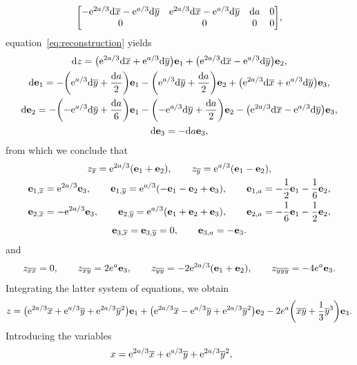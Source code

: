 \documentclass[10pt,a4paper]{amsart}
\numberwithin{equation}{section}
\newcommand{\ox}{\overline{x}}
\newcommand{\oy}{\overline{y}}
\newcommand{\ve}{\mathbf{e}}
\begin{document}
\begin{Example}
\begin{gather}
\begin{bmatrix}
%
-{\rm e}^{2a/3}{\rm d}\ox - {\rm e}^{a/3}{\rm d}\oy & {\rm e}^{2a/3}{\rm d}\ox - {\rm e}^{a/3}{\rm d}\oy & {\rm d}a & 0 \\
%
0 & 0 & 0 &0
\end{bmatrix}\!,
\label{bmu}
\end{gather}
%
equation~\eqref{eq:reconstruction} yields
%
\begin{gather*}
{\rm d}z = \big({\rm e}^{2a/3}{\rm d}\ox + {\rm e}^{a/3}{\rm d}\oy\big)\ve_1
+ \big({\rm e}^{2a/3}{\rm d}\ox - {\rm e}^{a/3}{\rm d}\oy\big)\ve_2,
\\
{\rm d}\ve_1 = -\bigg({\rm e}^{a/3} {\rm d}\oy + \frac{{\rm d}a}{2}\bigg)\ve_1 - \bigg({\rm e}^{a/3}{\rm d}\oy
+ \frac{{\rm d}a}{2}\bigg)\ve_2 + \big({\rm e}^{2a/3}{\rm d}\ox + {\rm e}^{a/3}{\rm d}\oy\big)\ve_3,
\\
{\rm d}\ve_2 = -\bigg({-}{\rm e}^{a/3} {\rm d}\oy + \frac{{\rm d}a}{6}\bigg)\ve_1 - \bigg({-}{\rm e}^{a/3} {\rm d}\oy + \frac{{\rm d}a}{2}\bigg)\ve_2 - \big({\rm e}^{2a/3}{\rm d}\ox - {\rm e}^{a/3}{\rm d}\oy\big)\ve_3, \\
%
{\rm d}\ve_3 = -{\rm d}a \ve_3,
\end{gather*}
%
from which we conclude that
%
\begin{gather*}
z_{\ox} = {\rm e}^{2a/3}(\ve_1 + \ve_2), \qquad
z_{\oy} = {\rm e}^{a/3}(\ve_1 - \ve_2),
\\
\ve_{1,\ox} = {\rm e}^{2a/3}\ve_3,\qquad
\ve_{1,\oy} = {\rm e}^{a/3}(-\ve_1-\ve_2+\ve_3),\qquad
\ve_{1,a} = -\frac{1}{2}\ve_1 - \frac{1}{6}\ve_2,
\\
\ve_{2,\ox} = -{\rm e}^{2a/3}\ve_3,\qquad
\ve_{2,\oy} = {\rm e}^{a/3}(\ve_1+\ve_2+\ve_3),\qquad
\ve_{2,a} = -\frac{1}{6}\ve_1 - \frac{1}{2}\ve_2,
\\
\ve_{3,\ox} =\ve_{3,\oy}=0,\qquad \ve_{3,a}=-\ve_3.
\end{gather*}
%
and
\begin{gather*}
z_{
\ox\ox} = 0,\qquad z_{\ox\oy} = 2e^a\ve_3,\qquad z_{\oy\oy} = -2{\rm e}^{2a/3}(\ve_1+\ve_2),\qquad z_{\oy\oy\oy}= -4e^a\ve_3.
\end{gather*}
Integrating the latter system of equations, we obtain
\begin{gather*}
z = \big({\rm e}^{2a/3}\ox + {\rm e}^{a/3}\oy + {\rm e}^{2a/3}\oy^2\big)\ve_1 + \big({\rm e}^{2a/3}\ox - {\rm e}^{a/3}\oy + {\rm e}^{2a/3}\oy^2\big)\ve_2 - 2e^a \bigg(\ox\oy + \frac{1}{3}\oy^3\bigg)\ve_3.
\end{gather*}
Introducing the variables
\begin{gather*}
x = {\rm e}^{2a/3}\ox + {\rm e}^{a/3}\oy + {\rm e}^{2a/3}\oy^2,\quad\ \

\end{gather*}
\end{Example}
\end{document}
